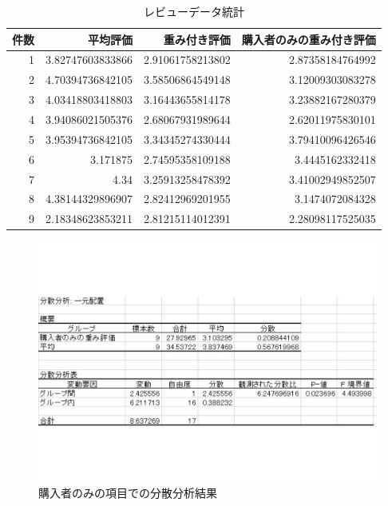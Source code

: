 \begin{table}[htb]
\label{reviewtoukei}
  \begin{center}
    \caption{レビューデータ統計}


\begin{tabular}{|r|r|r|r|}

\hline
件数 & 平均評価 & 重み付き評価 & 購入者のみの重み付き評価 \\
\hline\hline

1 &3.82747603833866 & 2.91061758213802 & 2.87358184764992\\


2 &4.70394736842105 & 3.58506864549148 & 3.12009303083278\\

3 &4.03418803418803 & 3.16443655814178 & 3.23882167280379\\

4 &3.94086021505376 & 2.68067931989644 & 2.62011975830101\\

5 &3.95394736842105 & 3.34345274330444 & 3.79410096426546\\

6 &3.171875 & 2.74595358109188 & 3.4445162332418\\

7 &4.34 & 3.25913258478392 & 3.41002949852507\\

8 &4.38144329896907 & 2.82412969201955 & 3.1474072084328\\

9 &2.18348623853211 & 2.81215114012391 & 2.28098117525035\\

	\hline
    \end{tabular}
  \end{center}
\end{table}


\begin{figure}[htbp]

\centering
\includegraphics[width=12cm,clip]{reviewtoukei4.pdf}
\caption{購入者のみの項目での分散分析結果}
\label{reviewtoukei4}

\end{figure}


